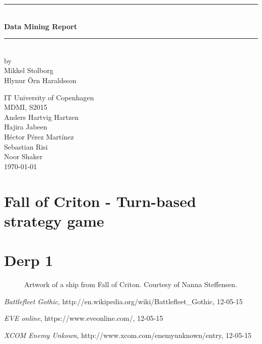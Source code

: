 \documentclass[a4paper,11pt]{article}
\begin{document}
\begin{titlepage}

\centering \parindent=0pt
\newcommand{\HRule}{\rule{\textwidth}{1mm}}
 \HRule\\[1cm]\Huge\bfseries
Data Mining Report\\[0.7cm]
\HRule\\[4cm]  
\large by 
\\ Mikkel Stolborg
\\ Hlynur Örn Haraldsson
 \normalsize %
\begin{flushleft}
IT University of Copenhagen \\
MDMI, S2015\\
Anders Hartvig Hartzen\\
Hajira Jabeen\\
Héctor Pérez Martínez\\
Sebastian Risi\\
Noor Shaker\\
\today \end{flushleft}
\end{titlepage}

\tableofcontents
\pagebreak
\section{Fall of Criton - Turn-based strategy game}


\section{Derp 1}
\begin{figure}[h]
	\centering
	\caption{Artwork of a ship from Fall of Criton. Courtesy of Nanna Steffensen.}
	\label{ArtShip}
\end{figure}


\appendix
\begin{thebibliography}{9}

  \emph{Battlefleet Gothic},
  http://en.wikipedia.org/wiki/Battlefleet\_Gothic,
  12-05-15
  
  \emph{EVE online},
  https://www.eveonline.com/,
  12-05-15

  \emph{XCOM Enemy Unkown},
  http://www.xcom.com/enemyunknown/entry,
  12-05-15 
\end{thebibliography}
\end{document}

